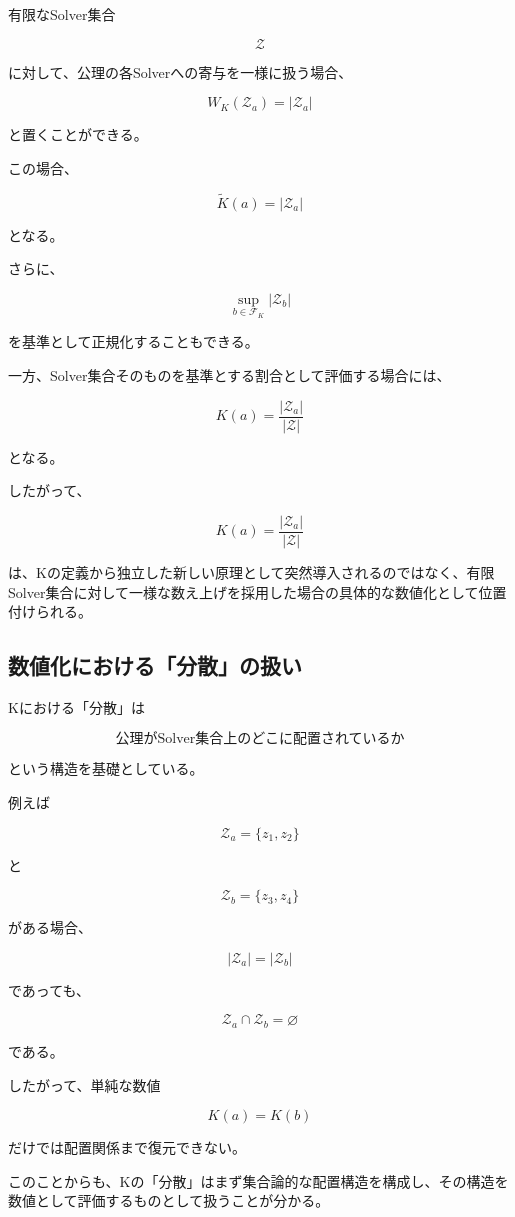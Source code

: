 有限なSolver集合

\[
\mathcal{Z}
\]

に対して、公理の各Solverへの寄与を一様に扱う場合、

\[
W_K(\mathcal{Z}_a) = |\mathcal{Z}_a|
\]

と置くことができる。

この場合、

\[
\widetilde{K}(a) = |\mathcal{Z}_a|
\]

となる。

さらに、

\[
\sup_{b\in\mathcal{F}_K}|\mathcal{Z}_b|
\]

を基準として正規化することもできる。

一方、Solver集合そのものを基準とする割合として評価する場合には、

\[
\boxed{K(a) = \frac{|\mathcal{Z}_a|}{|\mathcal{Z}|}}
\]

となる。

したがって、

\[
K(a) = \frac{|\mathcal{Z}_a|}{|\mathcal{Z}|}
\]

は、Kの定義から独立した新しい原理として突然導入されるのではなく、有限Solver集合に対して一様な数え上げを採用した場合の具体的な数値化として位置付けられる。

\subsection{数値化における「分散」の扱い}

Kにおける「分散」は

\[
\text{公理がSolver集合上のどこに配置されているか}
\]

という構造を基礎としている。

例えば

\[
\mathcal{Z}_a = \{z_1,z_2\}
\]

と

\[
\mathcal{Z}_b = \{z_3,z_4\}
\]

がある場合、

\[
|\mathcal{Z}_a| = |\mathcal{Z}_b|
\]

であっても、

\[
\mathcal{Z}_a\cap\mathcal{Z}_b = \varnothing
\]

である。

したがって、単純な数値

\[
K(a)=K(b)
\]

だけでは配置関係まで復元できない。

このことからも、Kの「分散」はまず集合論的な配置構造を構成し、その構造を数値として評価するものとして扱うことが分かる。

